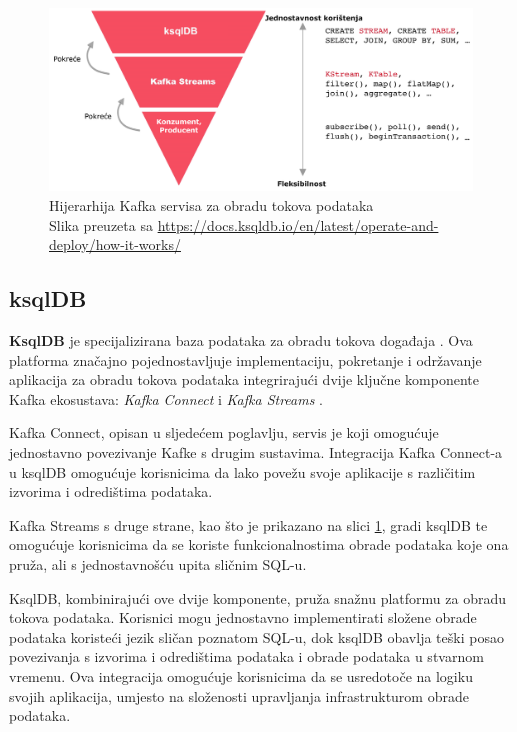 \documentclass[times, utf8, diplomski]{fer}
\begin{document}
\begin{figure}[htb]
	\centering
	\includegraphics[width=13cm]{images/ksql_streams_consumer.png}
	\caption[Hijerarhija Kafka servisa za obradu tokova podataka]{Hijerarhija Kafka servisa za obradu tokova podataka\\Slika preuzeta sa \url{https://docs.ksqldb.io/en/latest/operate-and-deploy/how-it-works/}}
	\label{fig:ksqldb_streams}
\end{figure}

\clearpage
\subsection{ksqlDB}
\label{sec:ksql}

\textbf{KsqlDB} je specijalizirana baza podataka za obradu tokova događaja . Ova platforma značajno pojednostavljuje implementaciju, pokretanje i održavanje aplikacija za obradu tokova podataka integrirajući dvije ključne komponente Kafka ekosustava: \emph{Kafka Connect} i \emph{Kafka Streams} \citep{seymour_mastering_2021}.

Kafka Connect, opisan u sljedećem poglavlju, servis je koji omogućuje jednostavno povezivanje Kafke s drugim sustavima. Integracija Kafka Connect-a u ksqlDB omogućuje korisnicima da lako povežu svoje aplikacije s različitim izvorima i odredištima podataka.

Kafka Streams s druge strane, kao što je prikazano na slici \ref{fig:ksqldb_streams}, gradi ksqlDB te omogućuje korisnicima da se koriste funkcionalnostima obrade podataka koje ona pruža, ali s jednostavnošću upita sličnim SQL-u.

KsqlDB, kombinirajući ove dvije komponente, pruža snažnu platformu za obradu tokova podataka. Korisnici mogu jednostavno implementirati složene obrade podataka koristeći jezik sličan poznatom SQL-u, dok ksqlDB obavlja teški posao povezivanja s izvorima i odredištima podataka i obrade podataka u stvarnom vremenu. Ova integracija omogućuje korisnicima da se usredotoče na logiku svojih aplikacija, umjesto na složenosti upravljanja infrastrukturom obrade podataka. \\
\end{document}
